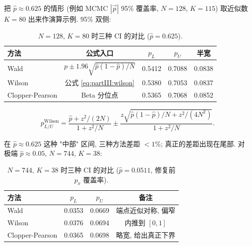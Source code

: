 把 $\hat p \approx 0.625$ 的情形 (例如 MCMC $|\vec p|$ 95\% 覆盖率, $N=128$, $K=115$) 取近似数 $K = 80$ 出来作演算示例. 95\% 双侧:

\begin{table}[H]
\centering\small
\caption{$N=128$, $K=80$ 时三种 CI 的对比 ($\hat p = 0.625$).}
\label{tab:partIII:cp_wilson_wald_demo}
\begin{tabular}{lcccc}
\toprule
方法 & 公式入口 & $p_L$ & $p_U$ & 半宽 \\
\midrule
Wald     & $\hat p \pm 1.96\sqrt{\hat p (1-\hat p)/N}$ & 0.5412 & 0.7088 & 0.0838 \\
Wilson   & 公式 \eqref{eq:partIII:wilson} & 0.5380 & 0.7053 & 0.0837 \\
Clopper-Pearson & Beta 分位点 & 0.5365 & 0.7068 & 0.0852 \\
\bottomrule
\end{tabular}
\end{table}

\begin{equation}
\label{eq:partIII:wilson}
  p_{L/U}^{\mathrm{Wilson}} = \frac{\hat p + z^2/(2N)}{1 + z^2/N}
  \pm \frac{z\sqrt{\hat p(1-\hat p)/N + z^2/(4N^2)}}{1 + z^2/N}.
\end{equation}


在 $\hat p \approx 0.625$ 这种 "中部" 区间, 三种方法差距 $< 1\%$; 真正的差距出现在尾部. 对极端 $\hat p \approx 0.05$, $N=744$, $K=38$:

\begin{table}[H]
\centering\small
\caption{$N=744$, $K=38$ 时三种 CI 的对比 ($\hat p = 0.0511$, 修复前 $p_x$ 覆盖率).}
\label{tab:partIII:cp_wilson_wald_extreme}
\begin{tabular}{lccc}
\toprule
方法 & $p_L$ & $p_U$ & 备注 \\
\midrule
Wald     & 0.0353 & 0.0669 & 端点近似对称, 偏窄 \\
Wilson   & 0.0376 & 0.0694 & 内推到 $[0, 1]$ \\
Clopper-Pearson & 0.0365 & 0.0698 & 略宽, 给出真正下界 \\
\bottomrule
\end{tabular}
\end{table}

